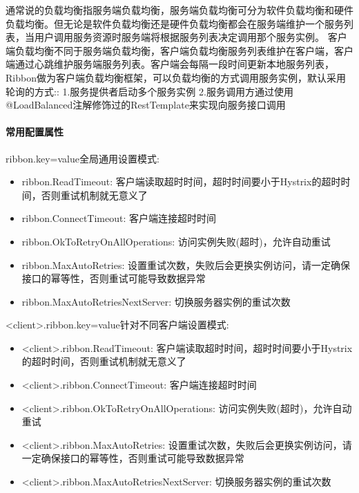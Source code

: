 \documentclass[letterpaper,10pt,english]{sphinxmanual}
\begin{document}
通常说的负载均衡指服务端负载均衡，服务端负载均衡可分为软件负载均衡和硬件负载均衡。但无论是软件负载均衡还是硬件负载均衡都会在服务端维护一个服务列表，当用户调用服务资源时服务端将根据服务列表决定调用那个服务实例。
客户端负载均衡不同于服务端负载均衡，客户端负载均衡服务列表维护在客户端，客户端通过心跳维护服务端服务列表。客户端会每隔一段时间更新本地服务列表，Ribbon做为客户端负载均衡框架，可以负载均衡的方式调用服务实例，默认采用轮询的方式::
1.服务提供者启动多个服务实例
2.服务调用方通过使用@LoadBalanced注解修饰过的RestTemplate来实现向服务接口调用


\paragraph{常用配置属性}
\label{\detokenize{01.spring-cloud/03.feign/ribbon_01:id2}}
ribbon.key=value全局通用设置模式:
\begin{itemize}
\item {} 
ribbon.ReadTimeout: 客户端读取超时时间，超时时间要小于Hystrix的超时时间，否则重试机制就无意义了

\item {} 
ribbon.ConnectTimeout: 客户端连接超时时间

\item {} 
ribbon.OkToRetryOnAllOperations: 访问实例失败(超时)，允许自动重试

\item {} 
ribbon.MaxAutoRetries: 设置重试次数，失败后会更换实例访问，请一定确保接口的幂等性，否则重试可能导致数据异常

\item {} 
ribbon.MaxAutoRetriesNextServer: 切换服务器实例的重试次数

\end{itemize}

\textless{}client\textgreater{}.ribbon.key=value针对不同客户端设置模式:
\begin{itemize}
\item {} 
\textless{}client\textgreater{}.ribbon.ReadTimeout: 客户端读取超时时间，超时时间要小于Hystrix的超时时间，否则重试机制就无意义了

\item {} 
\textless{}client\textgreater{}.ribbon.ConnectTimeout: 客户端连接超时时间

\item {} 
\textless{}client\textgreater{}.ribbon.OkToRetryOnAllOperations: 访问实例失败(超时)，允许自动重试

\item {} 
\textless{}client\textgreater{}.ribbon.MaxAutoRetries: 设置重试次数，失败后会更换实例访问，请一定确保接口的幂等性，否则重试可能导致数据异常

\item {} 
\textless{}client\textgreater{}.ribbon.MaxAutoRetriesNextServer: 切换服务器实例的重试次数

\end{itemize}
\end{document}
